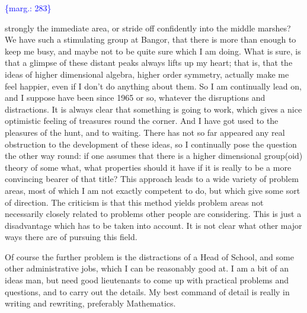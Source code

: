 \documentclass[11pt]{article}
\newcommand{\scanpage}[1]{\par\bigskip\noindent{\small\sffamily[scan #1]}\par}
\newcommand{\mspage}[1]{{\small\sffamily[p.\,#1]}}
\newcommand{\margin}[1]{\textcolor{blue}{\{\textsf{marg.:} #1\}}}
\begin{document}
\mspage{2}

\margin{283}

\clearpage
\scanpage{119/284}
strongly the immediate area, or stride off confidently into the middle
marshes? We have such a stimulating group at Bangor, that there is more
than enough to keep me busy, and maybe not to be quite sure which I am
doing. What is sure, is that a glimpse of these distant peaks always lifts
up my heart; that is, that the ideas of higher dimensional algebra, higher
order symmetry, actually make me feel happier, even if I don't do anything
about them. So I am continually lead on, and I suppose have been since 1965
or so, whatever the disruptions and distractions. It is always clear that
something is going to work, which gives a nice optimistic feeling of
treasures round the corner. And I have got used to the pleasures of the
hunt, and to waiting. There has not so far appeared any real obstruction to
the development of these ideas, so I continually pose the question the other
way round: if one assumes that there is a higher dimensional group(oid)
theory of some what, what properties should it have if it is really to be a
more convincing bearer of that title? This approach leads to a wide variety
of problem areas, most of which I am not exactly competent to do, but which
give some sort of direction. The criticism is that this method yields
problem areas not necessarily closely related to problems other people are
considering. This is just a disadvantage which has to be taken into
account. It is not clear what other major ways there are of pursuing this
field.

Of course the further problem is the distractions of a Head of School,
and some other administrative jobs, which I can be reasonably good at. I am
a bit of an ideas man, but need good lieutenants to come up with practical
problems and questions, and to carry out the details. My best command of
detail is really in writing and rewriting, preferably Mathematics.
\end{document}
